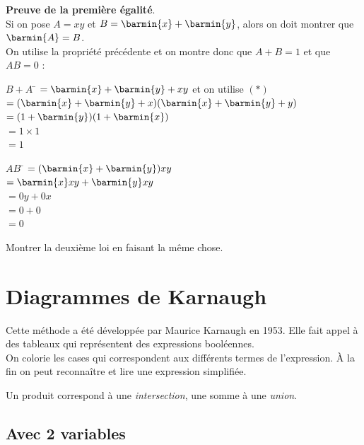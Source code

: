 \documentclass[a4paper,12pt,french]{book}
\begin{document}
\textbf{Preuve de la première égalité}.\\
 Si on pose $A=xy$ et $B=\barmin{x}+\barmin{y}$, alors on doit montrer que $\barmin{A}=B$.\\
On utilise la propriété précédente et on montre donc que $A+B = 1$ et que $AB=0$ :
\begin{multicols}{2}

	\begin{tabbing}
		$B+A$ 	\=	$=\barmin{x}+\barmin{y}+xy$ et on utilise $(*)$\\
				\>	$=(\barmin{x}+\barmin{y}+x)(\barmin{x}+\barmin{y}+y)$\\
				\>  $=(1+\barmin{y})(1+\barmin{x})$\\
				\>  $=1\times 1$\\
				\> 	$=1$
	\end{tabbing}

	\begin{tabbing}
		$AB$ \=  $=(\barmin{x}+\barmin{y})xy$\\
		\>  $=\barmin{x}xy+\barmin{y}xy$\\
		\> 	$=0y+0x$\\
		\> 	$=0+0$\\
		\> 	$=0$
	\end{tabbing}
\end{multicols}
\begin{exercice}[]
	Montrer la deuxième loi en faisant la même chose.
\end{exercice}



\section{Diagrammes de Karnaugh}

Cette méthode a été développée par Maurice Karnaugh en 1953. Elle fait appel à des tableaux qui représentent des expressions booléennes.\\
On colorie les cases qui correspondent aux différents termes de l'expression. À la fin on peut reconnaître et lire une expression simplifiée.

\begin{propriete}[]
	Un produit correspond à une \textit{intersection}, une somme à une \textit{union}.
\end{propriete}

\subsection*{Avec 2 variables}
\end{document}
